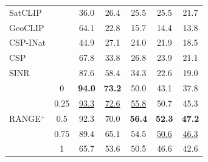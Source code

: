 \begin{table}[]
\begin{tabular}{l|c|ccccc}
SatCLIP &  & 36.0 & 26.4 & 25.5 & 25.5 & 21.7 \\
GeoCLIP &  & 64.1 & 22.8 & 15.7 & 14.4 & 13.8 \\
CSP-INat &  & 44.9 & 27.1 & 24.0 & 21.9 & 18.5 \\
CSP &  & 67.8 & 33.8 & 26.8 & 23.9 & 21.1 \\
SINR &  & 87.6 & 58.4 & 34.3 & 22.6 & 19.0 \\
\hline
 & 0       & \textbf{94.0}                                                                            & \textbf{73.2}                                                                           & 50.0                                                                                     & 43.1                                                                                     & 37.8                                                                                     \\
          & 0.25    & \underline{93.3}                                                                               & \underline{72.6}                                                                              & \underline{55.8}                                                                               & 50.7                                                                                     & 45.3                                                                                     \\
   RANGE$^+$       & 0.5     & 92.3                                                                                     & 70.0                                                                                    & \textbf{56.4}                                                                            & \textbf{52.3}                                                                            & \textbf{47.2}                                                                            \\
          & 0.75    & 89.4                                                                                     & 65.1                                                                                    & 54.5                                                                                     & \underline {50.6}                                                                               & \underline {46.3}                                                                               \\
          & 1       & 65.7                                                                                     & 53.6                                                                                    & 50.5                                                                                     & 46.6                                                                                     & 42.6                                                                                    

\end{tabular}
\end{table}

